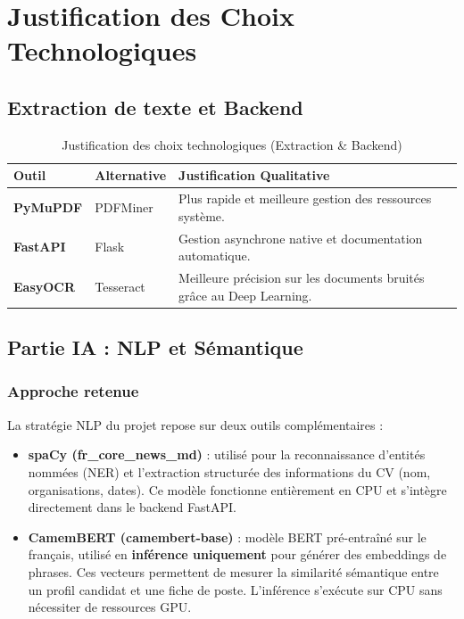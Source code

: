 \documentclass[12pt,a4paper]{report}
\begin{document}
\chapter{Justification des Choix Technologiques}

\section{Extraction de texte et Backend}
\begin{table}[H]
    \centering
    \begin{tabularx}{\textwidth}{llX}
        \toprule
        \textbf{Outil} & \textbf{Alternative} & \textbf{Justification Qualitative} \\
        \midrule
        \textbf{PyMuPDF} & PDFMiner & Plus rapide et meilleure gestion des ressources système. \\
        \textbf{FastAPI} & Flask & Gestion asynchrone native et documentation automatique. \\
        \textbf{EasyOCR} & Tesseract & Meilleure précision sur les documents bruités grâce au Deep Learning. \\
        \bottomrule
    \end{tabularx}
    \caption{Justification des choix technologiques (Extraction \& Backend)}
\end{table}

\section{Partie IA : NLP et Sémantique}

\subsection{Approche retenue}

La stratégie NLP du projet repose sur deux outils complémentaires :

\begin{itemize}
    \item \textbf{spaCy (fr\_core\_news\_md)} : utilisé pour la reconnaissance d'entités nommées (NER) et l'extraction structurée des informations du CV (nom, organisations, dates). Ce modèle fonctionne entièrement en CPU et s'intègre directement dans le backend FastAPI.
    \item \textbf{CamemBERT (camembert-base)} : modèle BERT pré-entraîné sur le français, utilisé en \textbf{inférence uniquement} pour générer des embeddings de phrases. Ces vecteurs permettent de mesurer la similarité sémantique entre un profil candidat et une fiche de poste. L'inférence s'exécute sur CPU sans nécessiter de ressources GPU.
\end{itemize}
\end{document}
